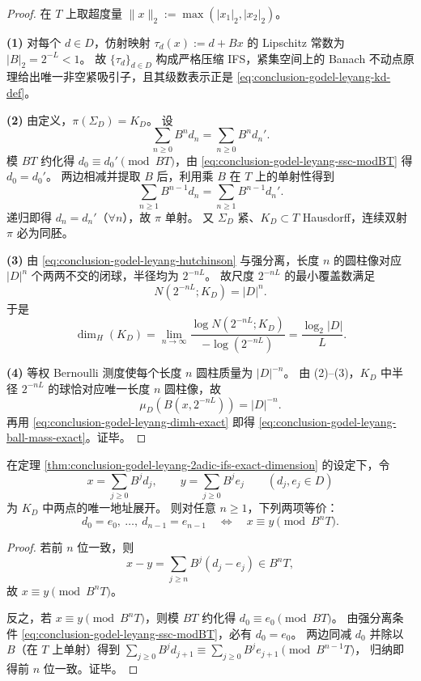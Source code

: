 \begin{proof}
在 \(T\) 上取超度量 \(\|x\|_2:=\max(|x_1|_2,|x_2|_2)\)。

\textbf{(1)} 对每个 \(d\in D\)，仿射映射 \(\tau_d(x):=d+Bx\) 的 Lipschitz 常数为 \(|B|_2=2^{-L}<1\)。
故 \(\{\tau_d\}_{d\in D}\) 构成严格压缩 IFS，紧集空间上的 Banach 不动点原理给出唯一非空紧吸引子，且其级数表示正是 \eqref{eq:conclusion-godel-leyang-kd-def}。

\textbf{(2)} 由定义，\(\pi(\Sigma_D)=K_D\)。
设
\[
\sum_{n\ge 0}B^n d_n=\sum_{n\ge 0}B^n d_n'.
\]
模 \(BT\) 约化得 \(d_0\equiv d_0'\pmod{BT}\)，由 \eqref{eq:conclusion-godel-leyang-ssc-modBT} 得 \(d_0=d_0'\)。
两边相减并提取 \(B\) 后，利用乘 \(B\) 在 \(T\) 上的单射性得到
\[
\sum_{n\ge 1}B^{n-1}d_n=\sum_{n\ge 1}B^{n-1}d_n'.
\]
递归即得 \(d_n=d_n'\)（\(\forall n\)），故 \(\pi\) 单射。
又 \(\Sigma_D\) 紧、\(K_D\subset T\) Hausdorff，连续双射 \(\pi\) 必为同胚。

\textbf{(3)} 由 \eqref{eq:conclusion-godel-leyang-hutchinson} 与强分离，长度 \(n\) 的圆柱像对应 \( |D|^n\) 个两两不交的闭球，半径均为 \(2^{-nL}\)。
故尺度 \(2^{-nL}\) 的最小覆盖数满足
\[
N(2^{-nL};K_D)=|D|^n.
\]
于是
\[
\dim_H(K_D)
=\lim_{n\to\infty}
\frac{\log N(2^{-nL};K_D)}{-\log(2^{-nL})}
=\frac{\log_2|D|}{L}.
\]

\textbf{(4)} 等权 Bernoulli 测度使每个长度 \(n\) 圆柱质量为 \(|D|^{-n}\)。
由 (2)--(3)，\(K_D\) 中半径 \(2^{-nL}\) 的球恰对应唯一长度 \(n\) 圆柱像，故
\[
\mu_D(B(x,2^{-nL}))=|D|^{-n}.
\]
再用 \eqref{eq:conclusion-godel-leyang-dimh-exact} 即得 \eqref{eq:conclusion-godel-leyang-ball-mass-exact}。证毕。
\end{proof}



\begin{proposition}\label{prop:conclusion-godel-leyang-prefix-congruence-equivalence}
在定理 \ref{thm:conclusion-godel-leyang-2adic-ifs-exact-dimension} 的设定下，令
\[
x=\sum_{j\ge 0}B^j d_j,\qquad
y=\sum_{j\ge 0}B^j e_j
\qquad (d_j,e_j\in D)
\]
为 \(K_D\) 中两点的唯一地址展开。
则对任意 \(n\ge 1\)，下列两项等价：
\[
d_0=e_0,\ \dots,\ d_{n-1}=e_{n-1}
\quad\Longleftrightarrow\quad
x\equiv y\pmod{B^nT}.
\]
\end{proposition}
\begin{proof}
若前 \(n\) 位一致，则
\[
x-y=\sum_{j\ge n}B^j(d_j-e_j)\in B^nT,
\]
故 \(x\equiv y\pmod{B^nT}\)。

反之，若 \(x\equiv y\pmod{B^nT}\)，则模 \(BT\) 约化得 \(d_0\equiv e_0\pmod{BT}\)。
由强分离条件 \eqref{eq:conclusion-godel-leyang-ssc-modBT}，必有 \(d_0=e_0\)。
两边同减 \(d_0\) 并除以 \(B\)（在 \(T\) 上单射）得到
\(
\sum_{j\ge 0}B^j d_{j+1}\equiv \sum_{j\ge 0}B^j e_{j+1}\pmod{B^{n-1}T}
\)，
归纳即得前 \(n\) 位一致。证毕。
\end{proof}

